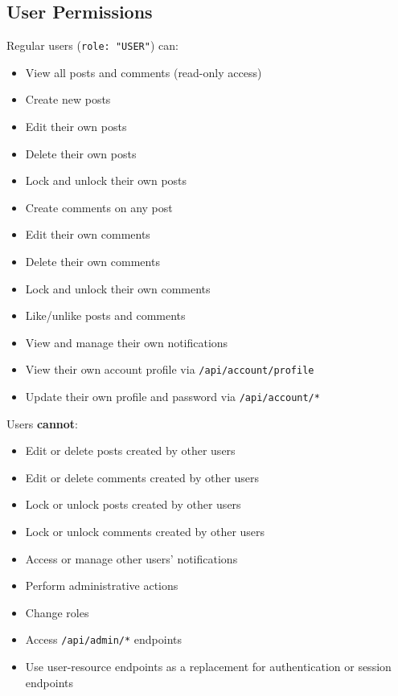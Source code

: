 \documentclass[11pt,a4paper]{article}
\begin{document}
\subsection{User Permissions}
Regular users (\texttt{role: "USER"}) can:
\begin{itemize}
    \item View all posts and comments (read-only access)
    \item Create new posts
    \item Edit their own posts
    \item Delete their own posts
    \item Lock and unlock their own posts
    \item Create comments on any post
    \item Edit their own comments
    \item Delete their own comments
    \item Lock and unlock their own comments
    \item Like/unlike posts and comments
    \item View and manage their own notifications
    \item View their own account profile via \texttt{/api/account/profile}
    \item Update their own profile and password via \texttt{/api/account/*}
\end{itemize}

Users \textbf{cannot}:
\begin{itemize}
    \item Edit or delete posts created by other users
    \item Edit or delete comments created by other users
    \item Lock or unlock posts created by other users
    \item Lock or unlock comments created by other users
    \item Access or manage other users' notifications
    \item Perform administrative actions
    \item Change roles
    \item Access \texttt{/api/admin/*} endpoints
    \item Use user-resource endpoints as a replacement for authentication or session endpoints
\end{itemize}
\end{document}
